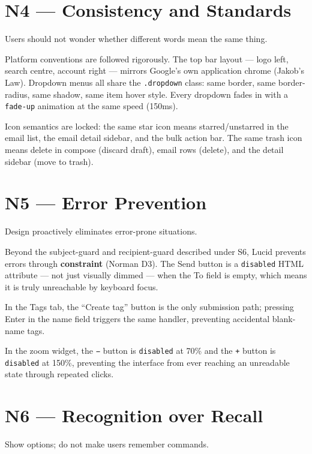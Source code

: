 \documentclass[12pt,a4paper]{report}
\begin{document}
\section{N4 — Consistency and Standards}

Users should not wonder whether different words mean the same thing.

Platform conventions are followed rigorously. The top bar layout — logo left, search
centre, account right — mirrors Google's own application chrome (Jakob's Law). Dropdown
menus all share the \texttt{.dropdown} class: same border, same border-radius, same shadow,
same item hover style. Every dropdown fades in with a \texttt{fade-up} animation at the same
speed (150ms).

Icon semantics are locked: the same star icon means starred/unstarred in the email list,
the email detail sidebar, and the bulk action bar. The same trash icon means delete in
compose (discard draft), email rows (delete), and the detail sidebar (move to trash).

\section{N5 — Error Prevention}

Design proactively eliminates error-prone situations.

Beyond the subject-guard and recipient-guard described under S6, Lucid prevents errors through
\textbf{constraint} (Norman D3). The Send button is a \texttt{disabled} HTML attribute —
not just visually dimmed — when the To field is empty, which means it is truly unreachable
by keyboard focus.

In the Tags tab, the ``Create tag'' button is the only submission path; pressing Enter
in the name field triggers the same handler, preventing accidental blank-name tags.

In the zoom widget, the \texttt{−} button is \texttt{disabled} at 70\% and the \texttt{+}
button is \texttt{disabled} at 150\%, preventing the interface from ever reaching an
unreadable state through repeated clicks.

\section{N6 — Recognition over Recall}

Show options; do not make users remember commands.
\end{document}
